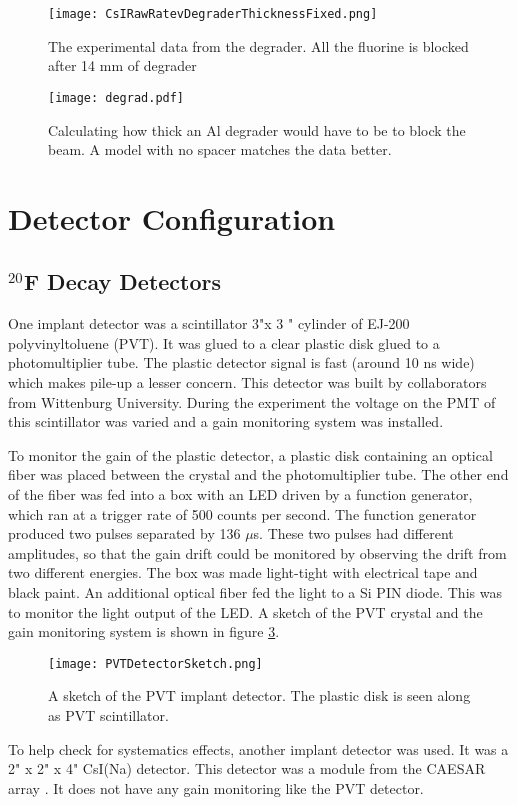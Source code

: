 \documentclass[../MaxHughesThesis.tex]{subfiles}
\begin{document}
\begin{figure}[!htb]
	\centerline{\texttt{[image: CsIRawRatevDegraderThicknessFixed.png]}}
	\caption{The experimental data from the degrader. 
		 All the fluorine is blocked after 14 mm of degrader}
	\label{fig:degraderdata}
\end{figure}

\begin{figure}[!htb]
	\centerline{\texttt{[image: degrad.pdf]}}
	\caption{Calculating how thick an Al degrader would have to be to block the beam.
	 	 A model with no spacer matches the data better.}
	\label{fig:lisealcalc}
\end{figure}

\section{Detector Configuration}

\subsection{$^{20}$F Decay Detectors}
One implant detector was a scintillator 3"\diameter x  3 " cylinder of EJ-200 polyvinyltoluene (PVT).
It was glued to a clear plastic disk glued to a photomultiplier tube.
The plastic detector signal is fast (around 10 ns wide) which makes pile-up a lesser concern.
This detector was built by collaborators from Wittenburg University.
During the experiment the voltage on the PMT of this scintillator was varied and a gain monitoring system was installed.

To monitor the gain of the plastic detector, a plastic disk containing an optical fiber was placed between the crystal and the photomultiplier tube. 
The other end of the fiber was fed into a box with an LED driven by a function generator, which ran at a trigger rate of 500 counts per second. 
The function generator produced two pulses separated by 136 $\mu$s.
These two pulses had different amplitudes, so that the gain drift could be monitored by observing the drift from two different energies.
The box was made light-tight with electrical tape and black paint.
An additional optical fiber fed the light to a Si PIN diode.
This was to monitor the light output of the LED.
A sketch of the PVT crystal and the gain monitoring system is shown in figure \ref{fig:PVTDetSketch}.

\begin{figure}
	\centerline{\texttt{[image: PVTDetectorSketch.png]}}
	\caption{A sketch of the PVT implant detector.
		    The plastic disk is seen along as PVT scintillator. 
		   }
	\label{fig:PVTDetSketch}
\end{figure}
To help check for systematics effects, another implant detector was used.
It was a 2" x 2" x 4"  CsI(Na) detector. 
This detector was a module from the CAESAR array \cite{Wei10}.
It does not have any gain monitoring like the PVT detector.
\end{document}
